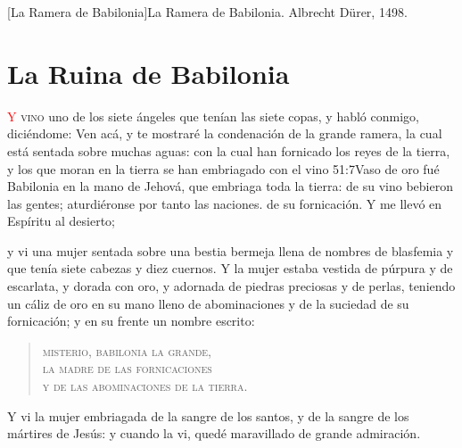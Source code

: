 [La Ramera de Babilonia]{La Ramera de Babilonia. Albrecht Dürer, 1498.}

\chapter{La Ruina de Babilonia}
\lettrine[lines=3,slope=-0.5em,loversize=0.1]{\textcolor{red}{Y}}{\hspace{0.5em} vino} uno de los siete ángeles que tenían las siete copas, y habló conmigo, diciéndome: Ven acá, y te mostraré la condenación de la grande ramera, la cual está sentada sobre muchas aguas:%
con la cual han fornicado los reyes de la tierra,%
 y los que moran en la tierra se han embriagado con el vino%
					  {51:7}{Vaso de oro fué Babilonia en la mano de Jehová, que embriaga toda la tierra: de su vino bebieron las gentes; aturdiéronse por tanto las naciones.}
 de su fornicación.%
Y me llevó en Espíritu al desierto; 

y vi una mujer sentada sobre una bestia bermeja llena de nombres de blasfemia y que tenía siete cabezas y diez cuernos. 
Y la mujer estaba vestida de púrpura y de escarlata, y dorada con oro, y adornada de piedras preciosas y de perlas,%
 teniendo un cáliz de oro en su mano lleno de abominaciones y de la suciedad de su fornicación; 
y en su frente un nombre escrito:%
\begin{verse}
\textsc{%
misterio, babilonia la grande,\\ 
la madre de las fornicaciones\\ 
y de las abominaciones de la tierra.%
}
\end{verse}
Y vi la mujer embriagada de la sangre de los santos, y de la sangre de los mártires de Jesús: y cuando la vi, quedé maravillado de grande admiración. 


